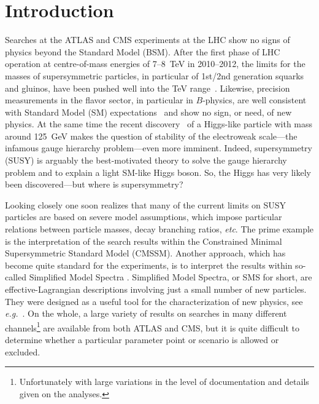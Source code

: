 \documentclass[12pt]{article}
\def\eg{{\it e.g.}}
\begin{document}


\section{Introduction}

Searches at the ATLAS and CMS experiments at the LHC show no signs of physics beyond the
Standard Model (BSM). 
After the first phase of LHC operation at centre-of-mass energies of 7--8~TeV in 2010--2012, 
the limits for the masses of supersymmetric particles, in particular of 1st/2nd generation
 squarks and gluinos, have been pushed well into the TeV range~\cite{atlas:susy:twiki,cms:susy:twiki}. 
Likewise, precision measurements in the flavor sector, in particular in $B$-physics, 
are well consistent with Standard Model (SM) expectations~\cite{Amhis:2012bh,lhcb:2012ct} 
and show no sign, or need, of new physics. 
At the same time the recent discovery~\cite{atlas:2012gk,cms:2012gu} of a Higgs-like particle 
with mass around 125~GeV makes the question of stability of the electroweak scale---the 
infamous gauge hierarchy problem---even  more imminent. 
Indeed, supersymmetry (SUSY) is arguably the best-motivated theory to solve the gauge 
hierarchy problem and to explain a light SM-like Higgs boson. 
So, the Higgs has very likely been discovered---but where is supersymmetry? 

Looking closely \cite{Sekmen:2011cz,Arbey:2011un,Papucci:2011wy,CahillRowley:2012kx,Dreiner:2012gx,Mahbubani:2012qq} 
one soon realizes that many of the current limits on SUSY particles are based 
on severe model assumptions, which impose particular relations between particle masses, decay 
branching ratios, {\it etc}. The prime example is the interpretation of the search results within the 
Constrained Minimal Supersymmetric Standard Model (CMSSM). Another approach, which   
has become quite standard for the experiments, is to interpret the results 
within so-called Simplified Model Spectra \cite{Okawa:2011xg,cms:2013wc}.  
Simplified Model Spectra, or SMS for short, are effective-Lagrangian descriptions involving %
just a small number of new particles. They were designed as a useful tool for the characterization 
of new physics, see \eg\ \cite{Alwall:2008ag,Alves:2011wf}. 
On the whole, a large variety of results on searches in many different channels\footnote{Unfortunately with large variations in the level of documentation and details given on the analyses.} are available from both ATLAS and CMS, but it is quite difficult to determine whether a particular parameter point or scenario is allowed or excluded. 
\end{document}
